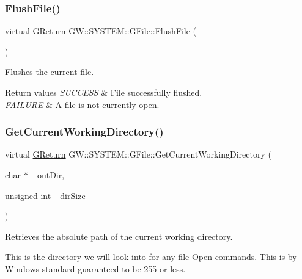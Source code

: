 \subsubsection{\texorpdfstring{Flush\+File()}{FlushFile()}}
{\footnotesize\ttfamily virtual \mbox{\hyperlink{namespaceGW_a67a839e3df7ea8a5c5686613a7a3de21}{G\+Return}} G\+W\+::\+S\+Y\+S\+T\+E\+M\+::\+G\+File\+::\+Flush\+File (\begin{DoxyParamCaption}{ }\end{DoxyParamCaption})\hspace{0.3cm}{\ttfamily [pure virtual]}}



Flushes the current file. 


\begin{DoxyRetVals}{Return values}
{\em S\+U\+C\+C\+E\+SS} & File successfully flushed. \\
\hline
{\em F\+A\+I\+L\+U\+RE} & A file is not currently open. \\
\hline
\end{DoxyRetVals}
\mbox{\label{classGW_1_1SYSTEM_1_1GFile_a6853b717e838d1b3a54f22449a37d764}} 
\subsubsection{\texorpdfstring{Get\+Current\+Working\+Directory()}{GetCurrentWorkingDirectory()}}
{\footnotesize\ttfamily virtual \mbox{\hyperlink{namespaceGW_a67a839e3df7ea8a5c5686613a7a3de21}{G\+Return}} G\+W\+::\+S\+Y\+S\+T\+E\+M\+::\+G\+File\+::\+Get\+Current\+Working\+Directory (\begin{DoxyParamCaption}\item[{char $\ast$}]{\+\_\+out\+Dir,  }\item[{unsigned int}]{\+\_\+dir\+Size }\end{DoxyParamCaption})\hspace{0.3cm}{\ttfamily [pure virtual]}}



Retrieves the absolute path of the current working directory. 

This is the directory we will look into for any file Open commands. This is by Windows standard guaranteed to be 255 or less.


